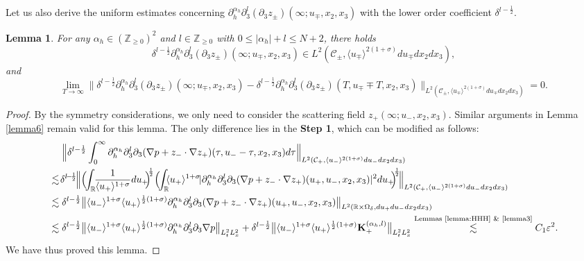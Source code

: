 \documentclass[10pt,reqno]{amsart}
\numberwithin{equation}{section}
\newtheorem{lemma}[theorem]{Lemma}
\begin{document}
Let us also derive the uniform estimates concerning $\partial_h^{\alpha_h}\partial_3^l(\partial_3z_\pm)(\infty;u_\mp,x_2,x_3)$ with the lower order coefficient $\delta^{l-\frac{1}{2}}$. 
\begin{lemma}\label{lemma7}
	For any $\alpha_h\in(\mathbb{Z}_{\geqslant 0})^2$ and $l\in\mathbb{Z}_{\geqslant 0}$ with 
	$0\leqslant|\alpha_h|+l\leqslant N+2$, there holds 
	\begin{equation*}
		\delta^{l-\frac{1}{2}}
		\partial_h^{\alpha_h}\partial_3^l (\partial_3z_{\pm})(\infty;u_\mp,x_2,x_3)\in L^2(\mathcal{C}_\pm,\langle u_\mp\rangle^{2(1+\sigma)}du_\mp dx_2dx_3),
	\end{equation*}
and 
\begin{equation*} 
	\lim_{T\to\infty}\Big\|\delta^{l-\frac{1}{2}}\partial_h^{\alpha_h}\partial_3^l(\partial_3z_{\pm})(\infty;u_\mp,x_2,x_3)-\delta^{l-\frac{1}{2}}\partial_h^{\alpha_h}\partial_3^l(\partial_3z_{\pm})(T,u_\mp\mp T,x_2,x_3)\Big\|_{L^2(\mathcal{C}_\pm,\langle u_\mp\rangle^{2(1+\sigma)}du_\mp dx_2dx_3)}=0.
\end{equation*}
\end{lemma}
\begin{proof}
By the symmetry considerations, we only need to consider  
the scattering field  $z_{+}(\infty;u_-,x_2,x_3)$.
Similar arguments  
 in Lemma \ref{lemma6} remain valid for this lemma. The only difference lies in the  \textbf{Step 1}, which can be modified as follows:
 \begin{align*}
 	&\ \ \ \ \Big\|\delta^{l-\frac{1}{2}}\int_0^{\infty} \partial_h^{\alpha_h}\partial_3^l\partial_3(\nabla p+z_{-}\cdot\nabla z_{+}) 
 	(\tau,u_--\tau,x_2,x_3)d\tau\Big\|_{L^2(\mathcal{C}_+,\langle u_-\rangle^{2(1+\sigma)}du_-dx_2dx_3)}\\
 	& 
 	\lesssim\!\delta^{l\!-\!\frac{1}{2}\!}\Big\|\Big(\!\!\int_{\mathbb{R}}\!\!\frac{1}{\langle u_+\rangle^{1+\sigma}}du_+\!\!\Big)^{\!\!\frac{1}{2}}\Big(\!\!\int_{\mathbb{R}}\!\!\langle u_+\rangle^{1+\sigma}\! |\partial_h^{\alpha_h}\partial_3^l\partial_3(\nabla p+z_{-}\cdot\nabla z_{+}) 
 	(u_+,u_-,x_2,x_3)|^2du_+\!\!\Big)^{\!\!\frac{1}{2}}\!\Big\|_{L^2(\mathcal{C}_+,\langle u_-\rangle^{2(1+\sigma)}du_-dx_2dx_3)}\\
 	&\lesssim\delta^{l-\frac{1}{2}}\big\|\langle u_-\rangle^{1+\sigma}\langle u_+\rangle^{\frac{1}{2}(1+\sigma)} \partial_h^{\alpha_h}\partial_3^l\partial_3(\nabla p+z_{-}\cdot\nabla z_{+}) 
 	(u_+,u_-,x_2,x_3)\big\|_{L^2(\mathbb{R}\times\Omega_\delta,du_+du_-dx_2dx_3)}\\
 	&\lesssim\delta^{l-\frac{1}{2}}\big\|\langle u_-\rangle^{1+\sigma}\langle u_+\rangle^{\frac{1}{2}(1+\sigma)}\partial_{h}^{\alpha_h}\partial_3^l\partial_3 \nabla p\big\|_{L^2_tL^2_x}+\delta^{l-\frac{1}{2}}\big\|\langle u_-\rangle^{1+\sigma}\langle u_+\rangle^{\frac{1}{2}(1+\sigma)}{\mathbf{K}_+^{(\alpha_h,l)}}\big\|_{L^2_tL^2_x}
 	\stackrel{\text{Lemmas \ref{lemma:HHH} \& \ref{lemma3}}}{\lesssim} C_1\varepsilon^2. 
 \end{align*}	
We have thus proved this lemma.
\end{proof}
\end{document}
